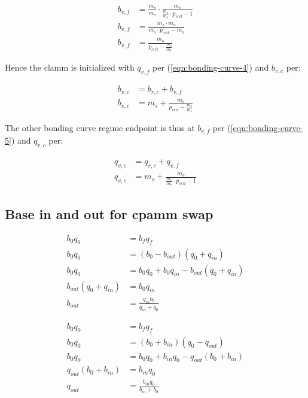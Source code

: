 \documentclass[table, twocolumn]{article}
\begin{document}
\begin{align} \label{eqn:bonding-curve-5}
  b_{v, f} & =
  \frac{m_s}{m_o} \cdot \frac{m_o}{\frac{m_s}{m_o} \cdot p_{crit} - 1} \nonumber \\
  b_{v, f} & =
  \frac{m_s \cdot m_o}{m_s \cdot p_{crit} - m_o} \nonumber                       \\
  b_{v, f} & = \frac{m_o}{p_{crit} - \frac{m_o}{m_s}}
\end{align}

Hence the \gls{clamm} is initialized with $q_{v, f}$ per (\ref{eqn:bonding-curve-4}) and
$b_{v, c}$ per:

\begin{align}
  b_{v, c} & = b_{r, c} + b_{v, f} \nonumber                \\
  b_{v, c} & = m_s + \frac{m_o}{p_{crit} - \frac{m_o}{m_s}}
\end{align}

The other bonding curve regime endpoint is thus at $b_{v, f}$ per
(\ref{eqn:bonding-curve-5}) and $q_{v, c}$ per:

\begin{align}
  q_{v, c} & = q_{r, c} + q_{v, f} \nonumber                        \\
  q_{v, c} & = m_o + \frac{m_o}{\frac{m_s}{m_o} \cdot p_{crit} - 1}
\end{align}

\subsection{Base in and out for \gls{cpamm} swap} \label{eqn:b-q-out-simple-derivation}

\begin{align}
  b_0 q_0               & = b_f q_f \nonumber                                      \\
  b_0 q_0               & = (b_0 - b_{out})(q_0 + q_{in}) \nonumber                \\
  b_0 q_0               & = b_0 q_0 + b_0 q_{in} - b_{out}(q_0 + q_{in}) \nonumber \\
  b_{out}(q_0 + q_{in}) & = b_{0} q_{in} \nonumber                                 \\
  b_{out}               & = \frac{q_{in} b_0}{q_{in} + q_0}
\end{align}

\begin{align}
  b_0 q_0               & = b_f q_f \nonumber                                      \\
  b_0 q_0               & = (b_0 + b_{in})(q_0 - q_{out}) \nonumber                \\
  b_0 q_0               & = b_0 q_0 + b_{in} q_0 - q_{out}(b_0 + b_{in}) \nonumber \\
  q_{out}(b_0 + b_{in}) & = b_{in} q_0 \nonumber                                   \\
  q_{out}               & = \frac{b_{in} q_0}{b_{in} + b_0}
\end{align}
\end{document}
